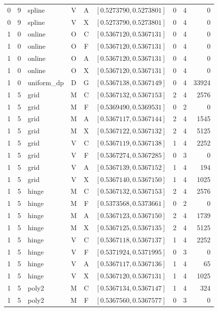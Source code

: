 \begin{longtable}{r r l c c l r r r}
0 & 9 & spline & V & A & $[0.5273790,0.5273801]$ & 0 & 4 & 0 \\
0 & 9 & spline & V & X & $[0.5273790,0.5273801]$ & 0 & 4 & 0 \\
1 & 0 & online & O & C & $[0.5367120,0.5367131]$ & 0 & 4 & 0 \\
1 & 0 & online & O & F & $[0.5367120,0.5367131]$ & 0 & 4 & 0 \\
1 & 0 & online & O & A & $[0.5367120,0.5367131]$ & 0 & 4 & 0 \\
1 & 0 & online & O & X & $[0.5367120,0.5367131]$ & 0 & 4 & 0 \\
1 & 0 & uniform\_dp & D & G & $[0.5367138,0.5367149]$ & 0 & 4 & 33924 \\
1 & 5 & grid & M & C & $[0.5367132,0.5367153]$ & 2 & 4 & 2576 \\
1 & 5 & grid & M & F & $[0.5369490,0.5369531]$ & 0 & 2 & 0 \\
1 & 5 & grid & M & A & $[0.5367117,0.5367144]$ & 2 & 4 & 1545 \\
1 & 5 & grid & M & X & $[0.5367122,0.5367132]$ & 2 & 4 & 5125 \\
1 & 5 & grid & V & C & $[0.5367119,0.5367138]$ & 1 & 4 & 2252 \\
1 & 5 & grid & V & F & $[0.5367274,0.5367285]$ & 0 & 3 & 0 \\
1 & 5 & grid & V & A & $[0.5367139,0.5367152]$ & 1 & 4 & 194 \\
1 & 5 & grid & V & X & $[0.5367140,0.5367150]$ & 1 & 4 & 1025 \\
1 & 5 & hinge & M & C & $[0.5367132,0.5367153]$ & 2 & 4 & 2576 \\
1 & 5 & hinge & M & F & $[0.5373568,0.5373661]$ & 0 & 2 & 0 \\
1 & 5 & hinge & M & A & $[0.5367123,0.5367150]$ & 2 & 4 & 1739 \\
1 & 5 & hinge & M & X & $[0.5367125,0.5367135]$ & 2 & 4 & 5125 \\
1 & 5 & hinge & V & C & $[0.5367118,0.5367137]$ & 1 & 4 & 2252 \\
1 & 5 & hinge & V & F & $[0.5371924,0.5371995]$ & 0 & 3 & 0 \\
1 & 5 & hinge & V & A & $[0.5367117,0.5367136]$ & 1 & 4 & 65 \\
1 & 5 & hinge & V & X & $[0.5367120,0.5367131]$ & 1 & 4 & 1025 \\
1 & 5 & poly2 & M & C & $[0.5367134,0.5367147]$ & 1 & 4 & 324 \\
1 & 5 & poly2 & M & F & $[0.5367560,0.5367577]$ & 0 & 3 & 0 \\

\end{longtable}
